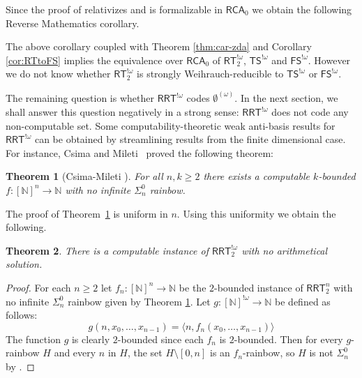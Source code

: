 \documentclass[10pt,a4paper]{article}
\newcommand{\RCA}[0]{\mathsf{RCA}}
\newcommand{\ACA}[0]{\mathsf{ACA}}
\newcommand{\RRT}[0]{\mathsf{RRT}}
\newcommand{\FS}[0]{\mathsf{FS}}
\newcommand{\TS}[0]{\mathsf{TS}}
\newcommand{\RT}[0]{\mathsf{RT}}
\newcommand{\NN}[0]{\mathbb{N}}
\newtheorem{theorem}{Theorem}
\numberwithin{theorem}{section}
\newtheorem{corollary}[theorem]{Corollary}
\begin{document}
Since the proof of  relativizes and is formalizable in $\RCA_0$ we obtain the following Reverse Mathematics corollary.


The above corollary coupled with Theorem \ref{thm:car-zda} and Corollary \ref{cor:RTtoFS} implies the equivalence over $\RCA_0$ of $\RT^{!\omega}_2$, $\TS^{!\omega}$ and $\FS^{!\omega}$. However we do not know whether $\RT^{!\omega}_2$ is strongly Weihrauch-reducible to $\TS^{!\omega}$ or $\FS^{!\omega}$.


The remaining question is whether $\RRT^{!\omega}$ codes $\emptyset^{(\omega)}$. In the next section, we shall answer this question negatively in a strong sense: $\RRT^{!\omega}$ does not code any non-computable set.
Some computability-theoretic weak anti-basis results for $\RRT^{!\omega}$ can be obtained by streamlining results from the finite dimensional case. For instance, Csima and Mileti~\cite{CsimaMileti_2009} proved the following theorem:

\begin{theorem}[Csima-Mileti \cite{CsimaMileti_2009}]\label{thm:csi-mil}
For all $n,k\geq 2$ there exists a computable $k$-bounded $f:[\NN]^n \to \NN$ with no infinite $\Sigma^0_n$ rainbow.
\end{theorem}

The proof of Theorem~\ref{thm:csi-mil} is uniform in $n$. Using this uniformity we obtain the following. 

\begin{theorem}
There is a computable instance of $\RRT^{!\omega}_2$ with no arithmetical solution.
\end{theorem}

\begin{proof}
    
For each $n\geq 2$ let $f_n : [\NN]^n \to \NN$  be the $2$-bounded instance of $\RRT^n_2$ with no infinite $\Sigma^0_n$ rainbow given by Theorem \ref{thm:csi-mil}. Let $g:[\NN]^{!\omega} \to \NN$ be defined as follows:
$$g(n, x_0, \dots, x_{n-1}) = \langle n, f_n(x_0, \dots, x_{n-1}) \rangle$$   %
The function $g$ is clearly $2$-bounded since each $f_n$ is $2$-bounded. Then for every $g$-rainbow $H$ and every $n$ in $H$, the set $H \setminus [0,n]$ is an $f_n$-rainbow, so $H$ is not $\Sigma^0_n$ by .
\end{proof}
\end{document}
